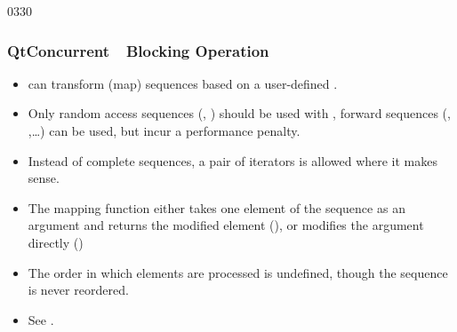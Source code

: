 \begin{slide}{0330}
\frametitle{QtConcurrent~\textemdash~Blocking Operation}
  \begin{itemize}
  \item {} can transform (map) sequences based on a
    user-defined \emph{}.
  \item Only random access sequences (, )
    should be used with , forward sequences
    (, ,\ldots) can be used, but incur a
    performance penalty.
  \item Instead of complete sequences, a pair of iterators is allowed
    where it makes sense.
  \item The mapping function either takes one element of the sequence
    as an argument and returns the modified element
    (), or modifies the argument directly
    ()
  \item The order in which elements are processed is undefined, though
    the sequence is never reordered.
  \item See .
  \end{itemize}
\end{slide}

